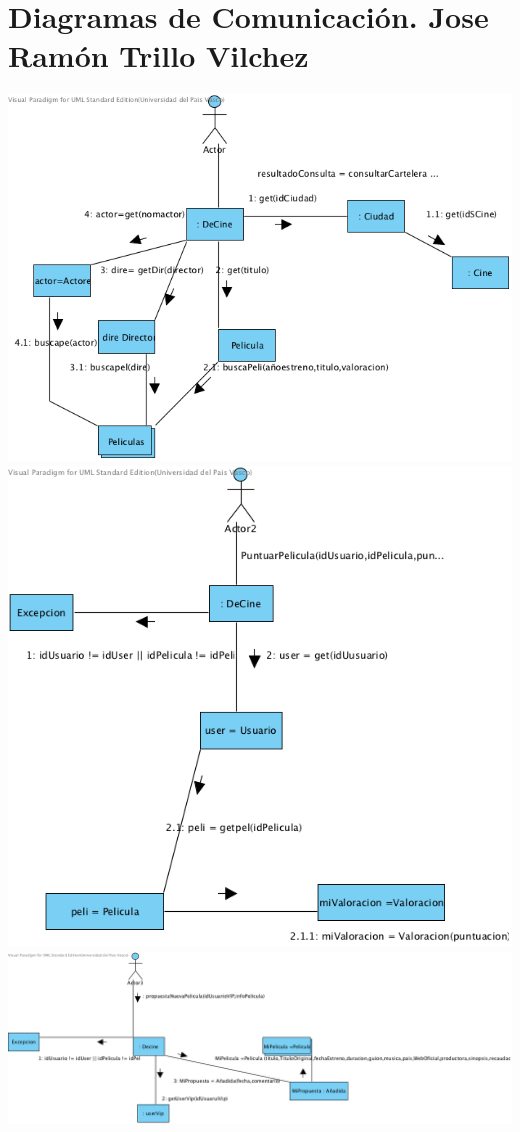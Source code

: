 \documentclass{article}
\begin{document}
\section{Diagramas de Comunicación. Jose Ramón Trillo Vilchez}
\begin{center}
\includegraphics[width=1.3\linewidth]{./J-1}
\includegraphics[width=1.3\linewidth]{./J-2}
\includegraphics[width=1.3\linewidth]{./J-3}

\end{center}
\end{document}
